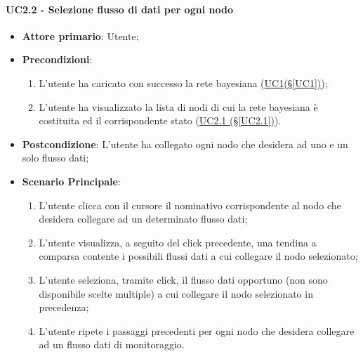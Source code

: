 \paragraph{UC2.2 - Selezione flusso di dati per ogni nodo}\label{UC2.2}
\begin{itemize}
\item \textbf{Attore primario}: Utente;
\item \textbf{Precondizioni}: 
\begin{enumerate}
	\item L'utente ha caricato con successo la rete bayesiana (\hyperref[UC1]{UC1(§\ref*{UC1})});
	\item L'utente ha visualizzato la lista di nodi di cui la rete bayesiana è costituita ed il corrispondente stato 			(\hyperref[UC2.1]{UC2.1 (§\ref*{UC2.1})}).
\end{enumerate}
\item \textbf{Postcondizione}: L'utente ha collegato ogni nodo che desidera ad uno e un solo flusso dati;
\item \textbf{Scenario Principale}:
 \begin{enumerate}
 \item L'utente clicca con il cursore il nominativo corrispondente al nodo che desidera collegare ad un determinato 		flusso dati;
 \item L'utente visualizza, a seguito del click precedente, una tendina a comparsa contente i possibili flussi dati 		a cui collegare il nodo selezionato;
 \item L'utente seleziona, tramite click, il flusso dati opportuno (non sono disponibile scelte multiple) a cui 					collegare il nodo selezionato in precedenza;
 \item L'utente ripete i passaggi precedenti per ogni nodo che desidera collegare ad un flusso dati di 									monitoraggio.
 \end{enumerate}
\end{itemize}

